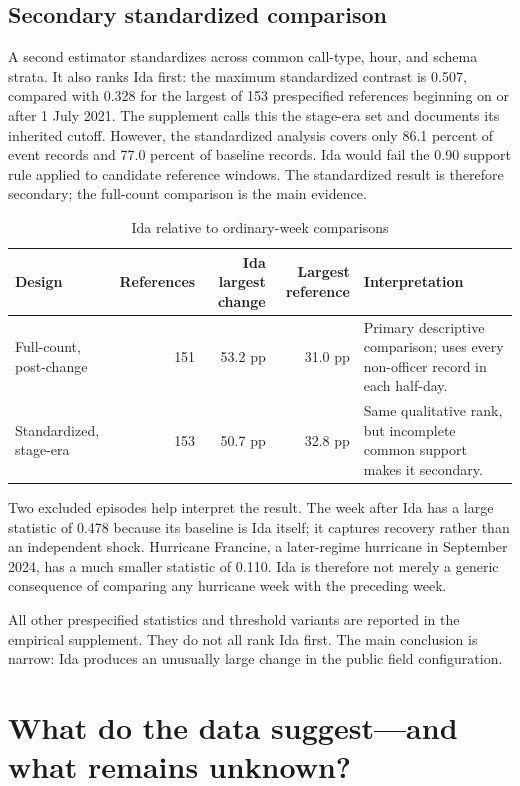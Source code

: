 \documentclass[11pt]{article}
\begin{document}
\subsection{Secondary standardized comparison}

A second estimator standardizes across common call-type, hour, and schema strata. It also ranks Ida first: the maximum standardized contrast is 0.507, compared with 0.328 for the largest of 153 prespecified references beginning on or after 1 July 2021. The supplement calls this the stage-era set and documents its inherited cutoff. However, the standardized analysis covers only 86.1 percent of event records and 77.0 percent of baseline records. Ida would fail the 0.90 support rule applied to candidate reference windows. The standardized result is therefore secondary; the full-count comparison is the main evidence.

\begin{table}[!htbp]
\centering
\caption{Ida relative to ordinary-week comparisons}
\label{tab:comparison}
\begin{tabularx}{\textwidth}{@{}lrrrX@{}}
\toprule
Design & References & Ida largest change & Largest reference & Interpretation \\
\midrule
Full-count, post-change & 151 & 53.2 pp & 31.0 pp &
Primary descriptive comparison; uses every non-officer record in each half-day. \\
Standardized, stage-era & 153 & 50.7 pp & 32.8 pp &
Same qualitative rank, but incomplete common support makes it secondary. \\
\bottomrule
\end{tabularx}
\end{table}

Two excluded episodes help interpret the result. The week after Ida has a large statistic of 0.478 because its baseline is Ida itself; it captures recovery rather than an independent shock. Hurricane Francine, a later-regime hurricane in September 2024, has a much smaller statistic of 0.110. Ida is therefore not merely a generic consequence of comparing any hurricane week with the preceding week.

All other prespecified statistics and threshold variants are reported in the empirical supplement. They do not all rank Ida first. The main conclusion is narrow: Ida produces an unusually large change in the public field configuration.

\section{What do the data suggest---and what remains unknown?}
\end{document}
